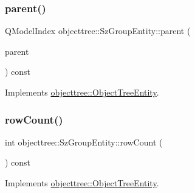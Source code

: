 \mbox{\label{classobjecttree_1_1_sz_group_entity_a294760034d11ac1477c86741603d6dea}} 
\subsubsection{\texorpdfstring{parent()}{parent()}}
{\footnotesize\ttfamily Q\+Model\+Index objecttree\+::\+Sz\+Group\+Entity\+::parent (\begin{DoxyParamCaption}\item[{const Q\+Model\+Index \&}]{parent }\end{DoxyParamCaption}) const\hspace{0.3cm}{\ttfamily [virtual]}}



Implements \mbox{\hyperlink{classobjecttree_1_1_object_tree_entity_a2d1b13c056476f87637aacd7e99e7305}{objecttree\+::\+Object\+Tree\+Entity}}.

\mbox{\label{classobjecttree_1_1_sz_group_entity_a5c47d480f3e52987053974d393329e86}} 
\subsubsection{\texorpdfstring{rowCount()}{rowCount()}}
{\footnotesize\ttfamily int objecttree\+::\+Sz\+Group\+Entity\+::row\+Count (\begin{DoxyParamCaption}{ }\end{DoxyParamCaption}) const\hspace{0.3cm}{\ttfamily [virtual]}}



Implements \mbox{\hyperlink{classobjecttree_1_1_object_tree_entity_a82c626bb28c55dcfce11cf7ec3368588}{objecttree\+::\+Object\+Tree\+Entity}}.

\mbox{\label{classobjecttree_1_1_sz_group_entity_a603dac80d7edb8ba7fd175ebe9acb1da}} 
